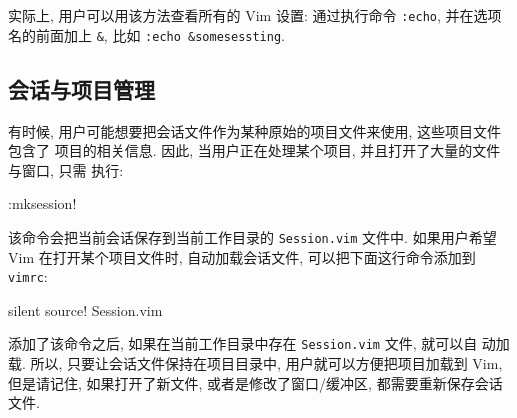 \begin{warning}
    实际上, 用户可以用该方法查看所有的 Vim 设置: 通过执行命令 \texttt{:echo},
    并在选项名的前面加上 \texttt{\&}, 比如 \texttt{:echo &somesessting}.
\end{warning}

\subsection{会话与项目管理}
\label{subsec:sessions_as_a_project_manager}

有时候, 用户可能想要把会话文件作为某种原始的项目文件来使用, 这些项目文件包含了
项目的相关信息. 因此, 当用户正在处理某个项目, 并且打开了大量的文件与窗口, 只需 
执行:
\begin{vimcode}
:mksession!
\end{vimcode}
该命令会把当前会话保存到当前工作目录的 \texttt{Session.vim} 文件中. 如果用户希望
Vim 在打开某个项目文件时, 自动加载会话文件, 可以把下面这行命令添加到
\texttt{vimrc}:
\begin{vimcode}
silent source! Session.vim
\end{vimcode}
添加了该命令之后, 如果在当前工作目录中存在 \texttt{Session.vim} 文件, 就可以自
动加载. 所以, 只要让会话文件保持在项目目录中, 用户就可以方便把项目加载到 Vim,
但是请记住, 如果打开了新文件, 或者是修改了窗口/缓冲区, 都需要重新保存会话文件.
